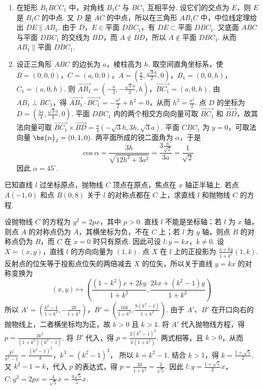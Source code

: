 \documentclass[UTF8,a4paper,oneside,11pt]{ctexbook}
\begin{document}
\begin{solution}
\begin{enumerate}
\item 在矩形 \(B_1BCC_1\) 中，对角线 \(B_1C\) 与 \(BC_1\) 互相平分. 设它们的交点为 \(E\)，则 \(E\) 是 \(B_1C\) 的中点. 又 \(D\) 是 \(AC\) 的中点，所以在三角形 \(AB_1C\) 中，中位线定理给出 \(DE\parallel AB_1\).
由于 \(D\)，\(E\in\text{平面 }DBC_1\)，有 \(DE\subset\text{平面 }DBC_1\). 又底面 \(ABC\) 与平面 \(DBC_1\) 的交线为 \(BD\)，而 \(A\notin BD\)，所以 \(A\notin\text{平面 }DBC_1\). 从而
\(AB_1\parallel\text{平面 }DBC_1\).
\item 设正三角形 \(ABC\) 的边长为 \(a\)，棱柱高为 \(h\). 取空间直角坐标系，使
\(B=(0,0,0)\)，\(C=(a,0,0)\)，\(A=\left(\frac a2,\frac{\sqrt3a}{2},0\right)\)，\(B_1=(0,0,h)\)，\(C_1=(a,0,h)\). 则 \(\overrightarrow{AB_1}=\left(-\frac a2,-\frac{\sqrt3a}{2},h\right)\)，\(\overrightarrow{BC_1}=(a,0,h)\).
由 \(AB_1\perp BC_1\)，得 \(\overrightarrow{AB_1}\cdot\overrightarrow{BC_1}=-\frac{a^2}{2}+h^2=0\)，从而 \(h^2=\frac{a^2}{2}\).
点 \(D\) 的坐标为 \(D=\left(\frac{3a}{4},\frac{\sqrt3a}{4},0\right)\).
平面 \(DBC_1\) 内的两个相交方向向量可取 \(\overrightarrow{BC_1}\) 和 \(\overrightarrow{BD}\)，故其法向量可取
\(\overrightarrow{BC_1}\times\overrightarrow{BD}=\frac a4\left(-\sqrt3h,3h,\sqrt3a\right)\).
平面 \(CBC_1\) 为 \(y=0\)，可取法向量 \(\bs{n}_2=(0,1,0)\). 两平面所成的锐二面角为 \(\alpha\)，于是
\[
\cos\alpha
=\frac{3h}{\sqrt{12h^2+3a^2}}
=\frac{3\frac{a}{\sqrt2}}{3a}
=\frac{1}{\sqrt2}
\]
因此 \(\alpha=45^\circ\).
\end{enumerate}
\end{solution}

\begin{problem}
已知直线 \(l\) 过坐标原点，抛物线 \(C\) 顶点在原点，焦点在 \(x\) 轴正半轴上. 若点 \(A(-1,0)\) 和点 \(B(0,8)\) 关于 \(l\) 的对称点都在 \(C\) 上，求直线 \(l\) 和抛物线 \(C\) 的方程.
\end{problem}

\begin{solution}
设抛物线 \(C\) 的方程为 \(y^2=2px\)，其中 \(p>0\). 直线 \(l\) 不能是坐标轴：若 \(l\) 为 \(x\) 轴，则点 \(A\) 的对称点仍为 \(A\)，其横坐标为负，不在 \(C\) 上；若 \(l\) 为 \(y\) 轴，则点 \(B\) 的对称点仍为 \(B\)，而 \(C\) 在 \(x=0\) 时只有原点. 因此可设
\(l:y=kx\)，\(k\neq0\).
设 \(X=(x,y)\)，直线 \(l\) 的方向向量为 \((1,k)\). 点 \(X\) 在 \(l\) 上的正投影为
\(\frac{x+ky}{1+k^2}(1,k)\).
反射点的位矢等于投影点位矢的两倍减去 \(X\) 的位矢，所以关于直线 \(y=kx\) 的对称变换为
\[
(x,y)\longmapsto
\left(\frac{(1-k^2)x+2ky}{1+k^2},
\frac{2kx+(k^2-1)y}{1+k^2}\right)
\]
所以 \(A'=\left(\frac{k^2-1}{1+k^2},-\frac{2k}{1+k^2}\right)\)，\(B'=\left(\frac{16k}{1+k^2},\frac{8(k^2-1)}{1+k^2}\right)\).
由于 \(A'\)、\(B'\) 在开口向右的抛物线上，二者横坐标均为正，故 \(k>0\) 且 \(k>1\). 将 \(A'\) 代入抛物线方程，得
\(p=\frac{2k^2}{(1+k^2)(k^2-1)}\).
将 \(B'\) 代入，得
\(p=\frac{2(k^2-1)^2}{k(1+k^2)}\).
两式相等，且 \(k>0\)，从而
\(\frac{k^2}{k^2-1}=\frac{(k^2-1)^2}{k}\)，\(k^3=(k^2-1)^3\)，
所以 \(k=k^2-1\). 结合 \(k>1\)，得 \(k=\frac{1+\sqrt5}{2}\).
又 \(k^2-1=k\)，代入 \(p\) 的表达式，得
\(p=\frac{2k}{1+k^2}=\frac{2}{\sqrt5}\). 因此 \(l:y=\frac{1+\sqrt5}{2}x\)，\(C:y^2=2px=\frac{4}{\sqrt5}x=\frac{4\sqrt5}{5}x\).
\end{solution}
\end{document}

